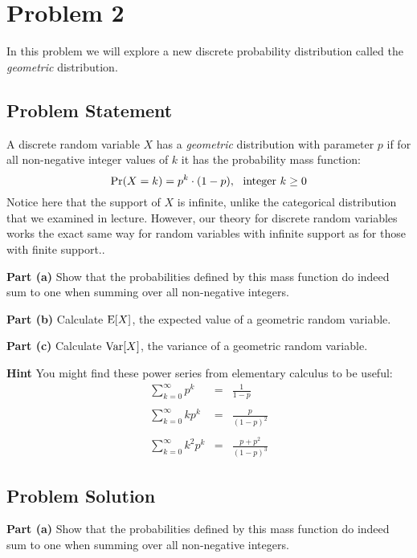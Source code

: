 \documentclass[12pt]{article}
\theoremstyle{definition}
\begin{document}
\section*{Problem 2}

In this problem we will explore a new discrete probability distribution called the {\em geometric} distribution.

\subsection*{Problem Statement}

A discrete random variable $X$ has a {\em geometric} distribution with parameter $p$ if for all non-negative integer values of $k$ it has the probability mass function:
$$
\Pr(X = k) = p^k \cdot (1-p),\ \ \hbox{integer } k \geq 0
$$
Notice here that the support of $X$ is infinite, unlike the categorical distribution that we examined in lecture. However, our theory for discrete random variables works the exact same way for random variables with infinite support as for those with finite support..

\bigskip
\noindent
{\bf Part (a)} Show that the probabilities defined by this mass function do indeed sum to one when summing over all non-negative integers.

\bigskip
\noindent
{\bf Part (b)} Calculate $\hbox{E}[X]$, the expected value of a geometric random variable.

\bigskip
\noindent
{\bf Part (c)} Calculate $\hbox{Var}[X]$, the variance of a geometric random variable.

\bigskip
\noindent
{\bf Hint} You might find these power series from elementary calculus to be useful:
\begin{eqnarray*}
\sum_{k=0}^\infty p^k & = & \frac{1}{1-p}\\
\\
\sum_{k=0}^\infty k p^k & = & \frac{p}{(1-p)^2}\\
\\
\sum_{k=0}^\infty k^2 p^k & = & \frac{p + p^2}{(1-p)^3}
\end{eqnarray*}

\newpage
\subsection*{Problem Solution}


\noindent
{\bf Part (a)} Show that the probabilities defined by this mass function do indeed sum to one when summing over all non-negative integers.
\end{document}
